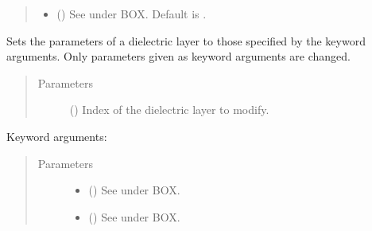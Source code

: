 \documentclass[letterpaper,10pt,english,openany]{sphinxmanual}
\begin{document}
\begin{fulllineitems}
\begin{fulllineitems}
\begin{quote}
\begin{description}
\begin{itemize}
\item {} 
 () \textendash{} See \label{\detokenize{source/sonpy:id15}}{\hyperref[\detokenize{source/users_guide:son15}]{\sphinxcrossref{{[}Son15{]}}}} under BOX. Default is .

\end{itemize}

\end{description}\end{quote}

\end{fulllineitems}


\begin{fulllineitems}
\label{\detokenize{source/sonpy:sonpy.sonnet.setDlayer}}
Sets the parameters of a dielectric layer to those specified by the keyword arguments. Only parameters given as keyword arguments are changed.
\begin{quote}\begin{description}
\item[{Parameters}] \leavevmode
{} () \textendash{} Index of the dielectric layer to modify.

\end{description}\end{quote}

Keyword arguments:
\begin{quote}\begin{description}
\item[{Parameters}] \leavevmode\begin{itemize}
\item {} 
 () \textendash{} See \label{\detokenize{source/sonpy:id16}}{\hyperref[\detokenize{source/users_guide:son15}]{\sphinxcrossref{{[}Son15{]}}}} under BOX.

\item {} 
 () \textendash{} See \label{\detokenize{source/sonpy:id17}}{\hyperref[\detokenize{source/users_guide:son15}]{\sphinxcrossref{{[}Son15{]}}}} under BOX.


\end{itemize}
\end{description}
\end{quote}
\end{fulllineitems}
\end{fulllineitems}
\end{document}
